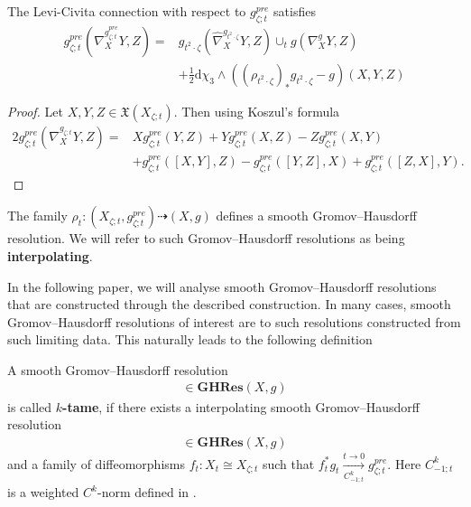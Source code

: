 \documentclass[psamsfonts]{amsart}
\theoremstyle{plain}
\theoremstyle{definition}{
\newtheorem{defi}{Definition}[section]
\newtheorem{ass}{Assumption}
\newtheorem*{nota}{Notation}}
\theoremstyle{remark}{
\newtheorem{rem}{Remark}
\newtheorem{ex}{Example}}
\theoremstyle{plain}{
\newtheorem{thm}{Theorem}[section]
\newtheorem{lem}{Lemma}[section]
\newtheorem{cor}{Corollary}[section]
\newtheorem{prop}{Proposition}[section]
\newtheorem{con}{Conjecture}[section]}
\newcommand{\m}[1]{{\mathrm{#1}}}
\newcommand{\cat}[1]{\textbf{#1}}
\begin{document}
\begin{lem}
    The Levi-Civita connection with respect to $g^{pre}_{\zeta;t}$ satisfies 
    \begin{align*}
        g^{pre}_{\zeta;t}(\nabla^{g^{pre}_{\zeta;t}}_XY,Z)=&g_{t^2\cdot\zeta}(\widehat{\nabla}^{g_{t^2\cdot\zeta}}_XY,Z)\cup_tg(\nabla^{g}_XY,Z)\\&+\frac{1}{2}\m{d}\chi_3\wedge((\rho_{t^2\cdot\zeta})_*g_{t^2\cdot\zeta}-g)(X,Y,Z)
    \end{align*}
\end{lem}

\begin{proof}
    Let $X,Y,Z\in\mathfrak{X}(X_{\zeta;t})$. Then using Koszul's formula
    \begin{align*}
        2g^{pre}_{\zeta;t}(\nabla^{g_{\zeta;t}}_XY,Z)=&Xg^{pre}_{\zeta;t}(Y,Z)+Yg^{pre}_{\zeta;t}(X,Z)-Zg^{pre}_{\zeta;t}(X,Y)\\
        &+g^{pre}_{\zeta;t}([X,Y],Z)-g^{pre}_{\zeta;t}([Y,Z],X)+g^{pre}_{\zeta;t}([Z,X],Y).
    \end{align*}
\end{proof}

\begin{cor}
    The family $\rho_t\colon(X_{\zeta;t},g^{pre}_{\zeta;t})\dashrightarrow (X,g)$ defines a smooth Gromov--Hausdorff resolution. We will refer to such Gromov--Hausdorff resolutions as being \textbf{interpolating}. 
\end{cor}


In the following paper, we will analyse smooth Gromov--Hausdorff resolutions that are constructed through the described construction. In many cases, smooth Gromov--Hausdorff resolutions of interest are  to such resolutions constructed from such limiting data. This naturally leads to the following definition

\begin{defi}
\label{ktame}
    A smooth Gromov--Hausdorff resolution 
    \begin{align*}
        [\rho_t\colon(X_t,g_t)\dashrightarrow (X,g)]\in\cat{GHRes}(X,g)
    \end{align*}
    is called \textbf{$k$-tame}, if there exists a interpolating smooth Gromov--Hausdorff resolution 
    \begin{align*}
        [\rho_{\zeta;t}\colon(X_{\zeta;t},g^{pre}_{\zeta;t})\dashrightarrow (X,g)]\in\cat{GHRes}(X,g)
    \end{align*}
    and a family of diffeomorphisms $f_t\colon X_t\cong X_{\zeta;t}$ such that $f_t^*g_t\xrightarrow[C^{k}_{-1;t}]{t\to 0} g_{\zeta;t}^{pre}$. Here $C^{k}_{-1;t}$ is a weighted $C^k$-norm defined in \cite[Def. 9.4]{majewskiDirac}.
\end{defi}
\end{document}
